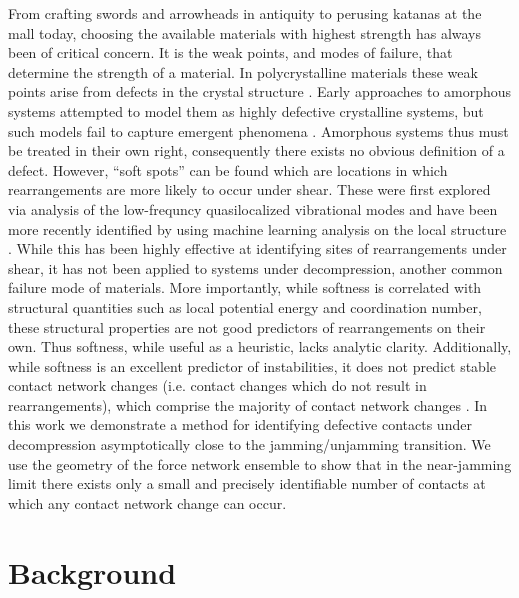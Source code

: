 From crafting swords and arrowheads in antiquity to perusing katanas at the mall today, choosing the available materials with highest strength has always been of critical concern. It is the weak points, and modes of failure, that determine the strength of a material. In polycrystalline materials these weak points arise from defects in the crystal structure \cite{taylor_mechanism_1934}. 
Early approaches to amorphous systems attempted to model them as highly defective crystalline systems, but such models fail to capture emergent phenomena \cite{goodrich_solids_2014}. Amorphous systems thus must be treated in their own right, consequently there exists no obvious definition of a defect. However, ``soft spots'' can be found which are locations in which rearrangements are more likely to occur under shear. These were first explored via analysis of the low-frequncy quasilocalized vibrational modes \cite{manning_vibrational_2011} and have been more recently identified by using machine learning analysis on the local structure \cite{cubuk_identifying_2015, cubuk_structural_2016, ding_soft_2014, wijtmans_disentangling_2017,schoenholz_structural_2016,schoenholz_understanding_2014,richard_predicting_2020,rocks_learning-based_2021,ridout_correlation_2020}.
While this has been highly effective at identifying sites of rearrangements under shear, it has not been applied to systems under decompression, another common failure mode of materials. More importantly, while softness is correlated with structural quantities such as local potential energy and coordination number, these structural properties are not good predictors of rearrangements on their own. Thus softness, while useful as a heuristic, lacks analytic clarity. Additionally, while softness is an excellent predictor of instabilities, it does not predict stable contact network changes (i.e. contact changes which do not result in rearrangements), which comprise the majority of contact network changes \cite{morse_differences_2020,tuckman_contact_2020}. In this work we demonstrate a method for identifying defective contacts under decompression asymptotically close to the jamming/unjamming transition. We use the geometry of the force network ensemble to show that in the near-jamming limit there exists only a small and precisely identifiable number of contacts at which any contact network change can occur.


\section{Background}

